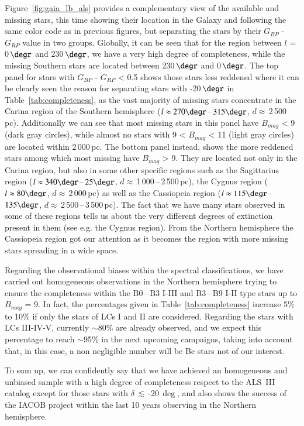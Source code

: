 \documentclass{aa}
\newcommand{\ls}{\mbox{$\lesssim$}}
\begin{document}
Figure~\ref{fig:gaia_lb_als} provides a complementary view of the available and missing stars, this time showing their location in the Galaxy and following the same color code as in previous figures, but separating the stars by their $G_{BP}$ - $G_{RP}$ value in two groups. Globally, it can be seen that for the region between $l$ = 0\,$\degr$ and 230\,$\degr$, we have a very high degree of completeness, while the missing Southern stars are located between 230\,$\degr$ and 0\,$\degr$. The top panel for stars with $G_{BP}$ - $G_{RP}$ < 0.5 shows those stars less reddened where it can be clearly seen the reason for separating stars with -20\,$\degr$ in Table~\ref{tab:completeness}, as the vast majority of missing stars concentrate in the Carina region of the Southern hemisphere ($l\approx270\degr$--\,$315\degr$, $d\approx$\,2\,500\,pc). Additionally we can see that most missing stars in this panel have $B_{mag}$ < 9 (dark gray circles), while almost no stars with 9 < $B_{mag}$ < 11 (light gray circles) are located within 2\,000\,pc. The bottom panel instead, shows the more reddened stars among which most missing have $B_{mag}$ > 9. They are located not only in the Carina region, but also in some other specific regions such as the Sagittarius region ($l\approx340\degr$--\,$25\degr$, $d\approx$\,1\,000\,--\,2\,500\,pc), the Cygnus region ($l\approx80\degr$, $d\approx$\,2\,000\,pc) as well as the Cassiopeia region ($l\approx115\degr$--\,$135\degr$, $d\approx$\,2\,500\,--\,3\,500\,pc). The fact that we have many stars observed in some of these regions tells us about the very different degrees of extinction present in them (see e.g. the Cygnus region). From the Northern hemisphere the Cassiopeia region got our attention as it becomes the region with more missing stars spreading in a wide space. 

Regarding the observational biases within the spectral classifications, we have carried out homogeneous observations in the Northern hemisphere trying to ensure the completeness within the B0\,--\,B3 I-III and B3\,--\,B9 I-II type stars up to $B_{mag}$ = 9. In fact, the percentages given in Table~\ref{tab:completeness} increase 5\% to 10\% if only the stars of LCs I and II are considered. Regarding the stars with LCs III-IV-V, currently $\sim$80\% are already observed, and we expect this percentage to reach $\sim$95\% in the next upcoming campaigns, taking into account that, in this case, a non negligible number will be Be stars not of our interest.

To sum up, we can confidently say that we have achieved an homogeneous and unbiased sample with a high degree of completeness respect to the ALS~III catalog except for those stars with $\delta$\,\ls\,-20\,$\deg$, and also shows the success of the IACOB project within the last 10 years observing in the Northern hemisphere.
\end{document}
